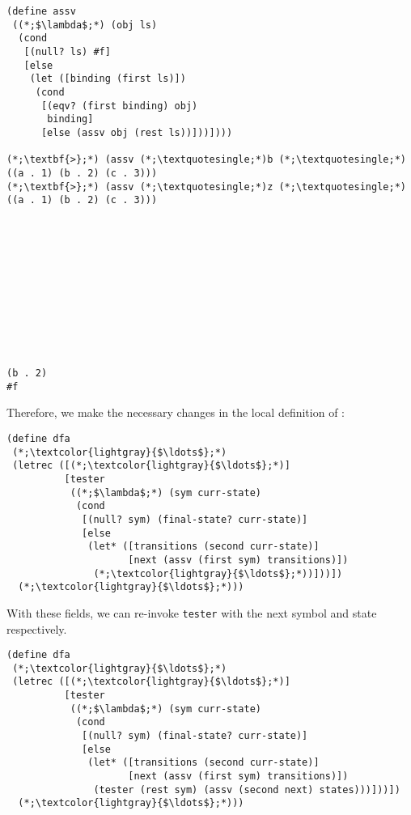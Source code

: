 \begin{cloast}[]{}
\begin{lstlisting}[language=MyScheme]
(define assv
 ((*;$\lambda$;*) (obj ls)
  (cond
   [(null? ls) #f]
   [else
    (let ([binding (first ls)])
     (cond
      [(eqv? (first binding) obj) 
       binding]
      [else (assv obj (rest ls))]))])))

(*;\textbf{>};*) (assv (*;\textquotesingle;*)b (*;\textquotesingle;*)((a . 1) (b . 2) (c . 3)))
(*;\textbf{>};*) (assv (*;\textquotesingle;*)z (*;\textquotesingle;*)((a . 1) (b . 2) (c . 3)))
\end{lstlisting}
\tcblower
\begin{lstlisting}[language=MyOutput]











(b . 2)
#f
\end{lstlisting}
\end{cloast}

\noindent Therefore, we make the necessary changes in the  local definition of :

\begin{cl}[]{}\begin{lstlisting}[language=MyScheme]
(define dfa
 (*;\textcolor{lightgray}{$\ldots$};*)
 (letrec ([(*;\textcolor{lightgray}{$\ldots$};*)]
          [tester 
           ((*;$\lambda$;*) (sym curr-state)
            (cond
             [(null? sym) (final-state? curr-state)]
             [else
              (let* ([transitions (second curr-state)]
                     [next (assv (first sym) transitions)])
               (*;\textcolor{lightgray}{$\ldots$};*))]))])
  (*;\textcolor{lightgray}{$\ldots$};*)))
\end{lstlisting}\end{cl}

\noindent With these fields, we can re-invoke \texttt{tester} with the next symbol and state respectively.

\begin{cl}[]{}\begin{lstlisting}[language=MyScheme]
(define dfa
 (*;\textcolor{lightgray}{$\ldots$};*)
 (letrec ([(*;\textcolor{lightgray}{$\ldots$};*)]
          [tester 
           ((*;$\lambda$;*) (sym curr-state)
            (cond
             [(null? sym) (final-state? curr-state)]
             [else
              (let* ([transitions (second curr-state)]
                     [next (assv (first sym) transitions)])
               (tester (rest sym) (assv (second next) states)))]))])
  (*;\textcolor{lightgray}{$\ldots$};*)))
\end{lstlisting}\end{cl}

